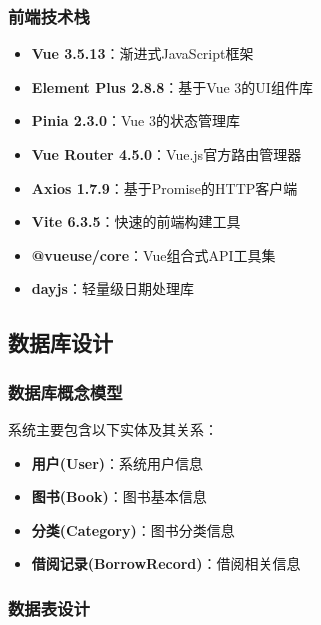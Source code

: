 \documentclass[12pt,a4paper]{article}
\begin{document}
\subsubsection{前端技术栈}
\begin{itemize}
    \item \textbf{Vue 3.5.13}：渐进式JavaScript框架
    \item \textbf{Element Plus 2.8.8}：基于Vue 3的UI组件库
    \item \textbf{Pinia 2.3.0}：Vue 3的状态管理库
    \item \textbf{Vue Router 4.5.0}：Vue.js官方路由管理器
    \item \textbf{Axios 1.7.9}：基于Promise的HTTP客户端
    \item \textbf{Vite 6.3.5}：快速的前端构建工具
    \item \textbf{@vueuse/core}：Vue组合式API工具集
    \item \textbf{dayjs}：轻量级日期处理库
\end{itemize}

\subsection{数据库设计}

\subsubsection{数据库概念模型}
系统主要包含以下实体及其关系：
\begin{itemize}
    \item \textbf{用户(User)}：系统用户信息
    \item \textbf{图书(Book)}：图书基本信息
    \item \textbf{分类(Category)}：图书分类信息
    \item \textbf{借阅记录(BorrowRecord)}：借阅相关信息
\end{itemize}

\subsubsection{数据表设计}
\end{document}
